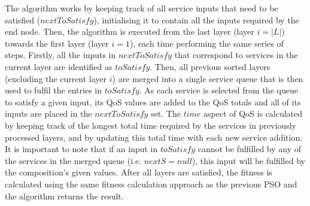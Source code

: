 \documentclass{llncs}
\begin{document}
The algorithm works by keeping track of all service inputs that need to be satisfied ($nextToSatisfy$), initialising it to contain all the inputs required by the end node. Then, the algorithm is executed from the last layer (layer $i = |L|$) towards the first layer (layer $i = 1$), each time performing the same series of steps. Firstly, all the inputs in $nextToSatisfy$ that correspond to services in the current layer are identified as $toSatisfy$. Then, all previous sorted layers (excluding the current layer $i$) are merged into a single service queue that is then used to fulfil the entries in $toSatisfy$. As each service is selected from the queue to satisfy a given input, its QoS values are added to the QoS totals and all of its inputs are placed in the $nextToSatisfy$ set. The $time$ aspect of QoS is calculated by keeping track of the longest total time required by the services in previously processed layers, and by updating this total time with each new service addition. It is important to note that if an input in $toSatisfy$ cannot be fulfilled by any of the services in the merged queue (i.e. $nextS = null$), this input will be fulfilled by the composition's given values. After all layers are satisfied, the fitness is calculated using the same fitness calculation approach as the previous PSO and the algorithm returns the result. 
\end{document}
